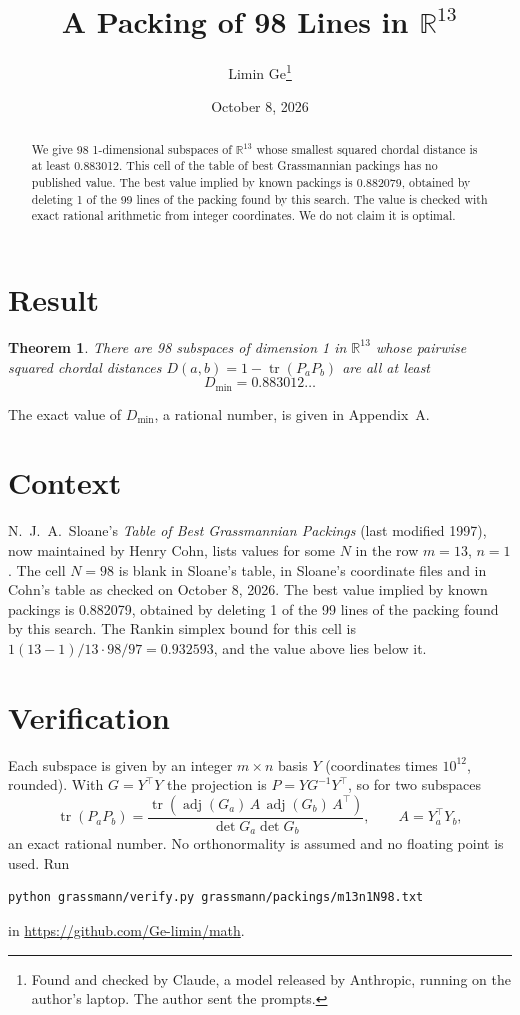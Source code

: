 \documentclass[11pt,a4paper]{article}
\title{A Packing of 98 Lines in $\mathbb{R}^{13}$}
\author{Limin Ge\thanks{Found and checked by Claude, a model released by Anthropic, running on the author's laptop. The author sent the prompts.}}
\date{October 8, 2026}
\newtheorem*{theorem}{Theorem}
\begin{document}
\maketitle
\begin{abstract}
We give 98 1-dimensional subspaces of $\mathbb{R}^{13}$ whose smallest squared chordal distance is at least 0.883012. This cell of the table of best Grassmannian packings has no published value. The best value implied by known packings is 0.882079, obtained by deleting 1 of the 99 lines of the packing found by this search. The value is checked with exact rational arithmetic from integer coordinates. We do not claim it is optimal.
\end{abstract}

\section{Result}
\begin{theorem}
There are 98 subspaces of dimension 1 in $\mathbb{R}^{13}$ whose pairwise squared chordal distances $D(a,b) = 1 - \operatorname{tr}(P_aP_b)$ are all at least
\[ D_{\min} = 0.883012\ldots \]
\end{theorem}
The exact value of $D_{\min}$, a rational number, is given in Appendix~A.


\section{Context}
N.~J.~A.~Sloane's \emph{Table of Best Grassmannian Packings} (last modified 1997), now maintained by Henry Cohn, lists values for some $N$ in the row $m=13$, $n=1$. The cell $N=98$ is blank in Sloane's table, in Sloane's coordinate files and in Cohn's table as checked on October 8, 2026. The best value implied by known packings is 0.882079, obtained by deleting 1 of the 99 lines of the packing found by this search. The Rankin simplex bound for this cell is $1(13-1)/13\cdot 98/97 = 0.932593$, and the value above lies below it.


\section{Verification}
Each subspace is given by an integer $m\times n$ basis $Y$ (coordinates times $10^{12}$, rounded). With $G=Y^\top Y$ the projection is $P=YG^{-1}Y^\top$, so for two subspaces
\[ \operatorname{tr}(P_aP_b)=\frac{\operatorname{tr}(\operatorname{adj}(G_a)\,A\,\operatorname{adj}(G_b)\,A^\top)}{\det G_a\det G_b},\qquad A=Y_a^\top Y_b, \]
an exact rational number. No orthonormality is assumed and no floating point is used. Run
\begin{verbatim}
python grassmann/verify.py grassmann/packings/m13n1N98.txt
\end{verbatim}
in \url{https://github.com/Ge-limin/math}.
\end{document}
